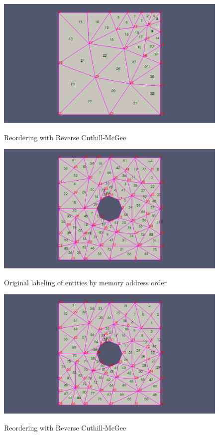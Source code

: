 \documentclass{article}
\begin{document}
\begin{figure}[h]
\caption{Reordering with Reverse Cuthill-McGee}
{\includegraphics[width = 15cm ]{post_b}}
\centering
\end{figure}

\begin{figure}[h]
\caption{Original labeling of entities by memory address order}
{\includegraphics[width = 15cm ]{pre_c}}
\centering
\end{figure}

\begin{figure}[h]
\caption{Reordering with Reverse Cuthill-McGee}
{\includegraphics[width = 15cm ]{post_c}}
\centering
\end{figure}
\end{document}
